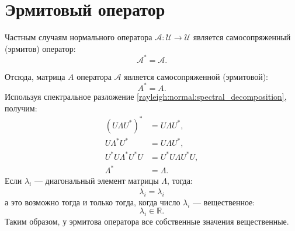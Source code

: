 \section{Эрмитовый оператор}

Частным случаям нормального оператора $\mathcal{A} : \mathcal{U} \rightarrow \mathcal{U}$ является самосопряженный (эрмитов) оператор:
\[
    \mathcal{A}^* = \mathcal{A}.
\]

Отсюда, матрица $A$ оператора $\mathcal{A}$ является самосопряженной (эрмитовой):
\[
    A^* = A.
\]
Используя спектральное разложение \eqref{rayleigh:normal:spectral_decomposition}, получим:
\begin{align*}
    \left ( U \Lambda U^* \right )^* & = U \Lambda U^* , \\
    U \Lambda^* U^* & = U \Lambda U^* , \\
    U^* U \Lambda^* U^* U & = U^* U \Lambda U^* U, \\
    \Lambda^* & = \Lambda .
\end{align*}
Если $\lambda_i$ --- диагональный элемент матрицы $\Lambda$, тогда:
\[
    \overline{\lambda_i} = \lambda_i
\]
а это возможно тогда и только тогда, когда число $\lambda_i$ --- вещественное:
\[
    \lambda_i \in \mathbb{R}.
\]
Таким образом, у эрмитова оператора все собственные значения вещественные.

